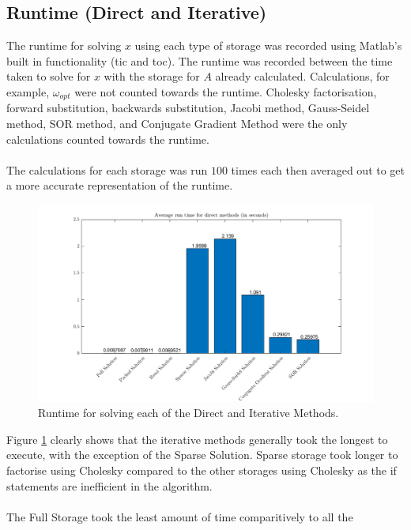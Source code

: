 \documentclass[12pt,a4paper]{article}
\begin{document}
\subsection{Runtime (Direct and Iterative)}
The runtime for solving $x$ using each type of storage was recorded using Matlab's built in functionality (tic and toc). The runtime was recorded between the time taken to solve for $x$ with the storage for $A$ already calculated. Calculations, for example, $\omega_{opt}$ were not counted towards the runtime. Cholesky factorisation, forward substitution, backwards substitution, Jacobi method, Gauss-Seidel method, SOR method, and Conjugate Gradient Method were the only calculations counted towards the runtime.
\\\\
The calculations for each storage was run $100$ times each then averaged out to get a more accurate representation of the runtime.
\begin{figure}[H]
	\includegraphics[width=\linewidth]{images/RuntimeGraph.png}
	\caption{Runtime for solving each of the Direct and Iterative Methods.}
	\label{fig:runtime}
\end{figure}
Figure \ref{fig:runtime} clearly shows that the iterative methods generally took the longest to execute, with the exception of the Sparse Solution. Sparse storage took longer to factorise using Cholesky compared to the other storages using Cholesky as the if statements are inefficient in the algorithm.
\\\\
The Full Storage took the least amount of time comparitively to all the 
\end{document}
